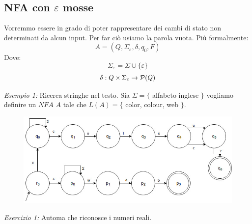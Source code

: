 \subsection{NFA con $\varepsilon$ mosse}
Vorremmo essere in grado di poter rappresentare dei cambi di stato non determinati da alcun input. Per far ci\`o usiamo la parola vuota. Pi\`u formalmente: 
\[
	A = (Q, \Sigma_{\varepsilon}, \delta, q_0, F)
\]
Dove:
\[
	\Sigma_{\varepsilon} = \Sigma \cup \{\varepsilon\}
\]
\[
	\delta : Q \times \Sigma_{\varepsilon} \to {\cal P}(Q)
\]
\begin{description}
	\item \emph{Esempio 1:} Ricerca stringhe nel testo. Sia $\Sigma = \{$ alfabeto inglese $\}$ vogliamo definire un $NFA$ $A$ tale che $L(A) = \{$ color, colour, web $\}$.
	\begin{figure}[H]
		\includegraphics[scale=0.6]{nfa2}
	\end{figure}
	\item \emph{Esercizio 1:} Automa che riconosce i numeri reali.
\end{description}

